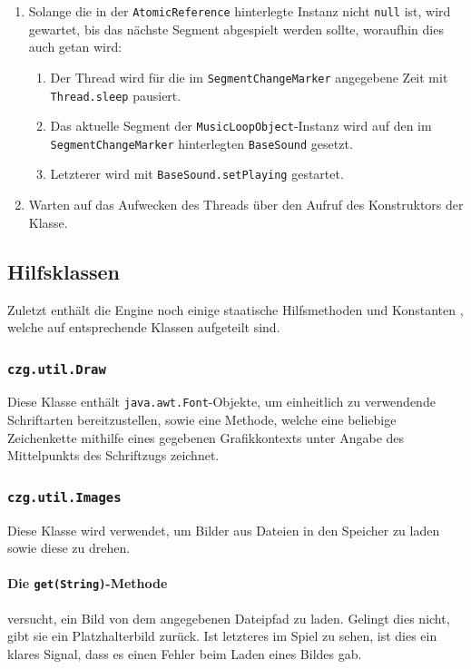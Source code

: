\begin{sloppypar}
\begin{enumerate}
	\item Solange die in der \texttt{AtomicReference} hinterlegte
	      Instanz nicht \texttt{null} ist, wird gewartet, bis das
	      nächste Segment abgespielt werden sollte, woraufhin dies
	      auch getan wird:
	      \begin{enumerate}
	      	\item Der Thread wird für die im \texttt{SegmentChangeMarker}
	      	      angegebene Zeit mit \texttt{Thread.sleep} pausiert.
	      	\item Das aktuelle Segment der \texttt{MusicLoopObject}-Instanz
	      	      wird auf den im \texttt{SegmentChangeMarker} hinterlegten
	      	      \texttt{BaseSound} gesetzt.
	      	\item Letzterer wird mit \texttt{BaseSound.setPlaying} gestartet.
	      \end{enumerate}
	\item Warten auf das Aufwecken des Threads über den Aufruf
	      des Konstruktors der Klasse.
\end{enumerate}


\subsection{Hilfsklassen}

Zuletzt enthält die Engine noch einige staatische Hilfsmethoden und
Konstanten , welche auf entsprechende Klassen aufgeteilt sind.

\subsubsection{\texttt{czg.util.Draw}}

Diese Klasse enthält \texttt{java.awt.Font}-Objekte, um einheitlich zu
verwendende Schriftarten bereitzustellen, sowie eine Methode, welche
eine beliebige Zeichenkette mithilfe eines gegebenen Grafikkontexts unter
Angabe des Mittelpunkts des Schriftzugs zeichnet.


\subsubsection{\texttt{czg.util.Images}}

Diese Klasse wird verwendet, um Bilder aus Dateien in den Speicher zu
laden sowie diese zu drehen.

\paragraph{Die \texttt{get(String)}-Methode} versucht, ein Bild von
dem angegebenen Dateipfad zu laden. Gelingt dies nicht, gibt sie ein
Platzhalterbild zurück. Ist letzteres im Spiel zu sehen, ist dies ein
klares Signal, dass es einen Fehler beim Laden eines Bildes gab.


\end{sloppypar}
